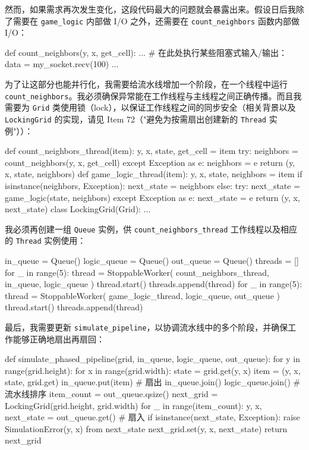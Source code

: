 然而，如果需求再次发生变化，这段代码最大的问题就会暴露出来。假设日后我除了需要在 \texttt{game\_logic} 内部做 I/O 之外，还需要在 \texttt{count\_neighbors} 函数内部做 I/O：

\begin{codebox}[python]
def count_neighbors(y, x, get_cell):
    ...
    # 在此处执行某些阻塞式输入/输出：
    data = my_socket.recv(100)
    ...
\end{codebox}

为了让这部分也能并行化，我需要给流水线增加一个阶段，在一个线程中运行 \texttt{count\_neighbors}。我必须确保异常能在工作线程与主线程之间正确传播。而且我需要为 \texttt{Grid} 类使用锁（lock），以保证工作线程之间的同步安全（相关背景以及 \texttt{LockingGrid} 的实现，请见 Item 72（"避免为按需扇出创建新的 \texttt{Thread} 实例"））：

\begin{codebox}[python]
def count_neighbors_thread(item):
    y, x, state, get_cell = item
    try:
        neighbors = count_neighbors(y, x, get_cell)
    except Exception as e:
        neighbors = e
    return (y, x, state, neighbors)
def game_logic_thread(item):
    y, x, state, neighbors = item
    if isinstance(neighbors, Exception):
        next_state = neighbors
    else:
        try:
            next_state = game_logic(state, neighbors)
        except Exception as e:
            next_state = e
    return (y, x, next_state)
class LockingGrid(Grid):
    ...
\end{codebox}

我必须再创建一组 \texttt{Queue} 实例，供 \texttt{count\_neighbors\_thread} 工作线程以及相应的 \texttt{Thread} 实例使用：

\begin{codebox}[python]
in_queue = Queue()
logic_queue = Queue()
out_queue = Queue()
threads = []
for _ in range(5):
    thread = StoppableWorker(
        count_neighbors_thread, in_queue, logic_queue
    )
    thread.start()
    threads.append(thread)
for _ in range(5):
    thread = StoppableWorker(
        game_logic_thread, logic_queue, out_queue
    )
    thread.start()
    threads.append(thread)
\end{codebox}

最后，我需要更新 \texttt{simulate\_pipeline}，以协调流水线中的多个阶段，并确保工作能够正确地扇出再扇回：

\begin{codebox}[python]
def simulate_phased_pipeline(grid, in_queue, logic_queue,
out_queue):
    for y in range(grid.height):
        for x in range(grid.width):
            state = grid.get(y, x)
            item = (y, x, state, grid.get)
            in_queue.put(item)            # 扇出
    in_queue.join()
    logic_queue.join()                    # 流水线排序
    item_count = out_queue.qsize()
    next_grid = LockingGrid(grid.height, grid.width)
    for _ in range(item_count):
        y, x, next_state = out_queue.get()  # 扇入
        if isinstance(next_state, Exception):
            raise SimulationError(y, x) from next_state
        next_grid.set(y, x, next_state)
    return next_grid
\end{codebox}

